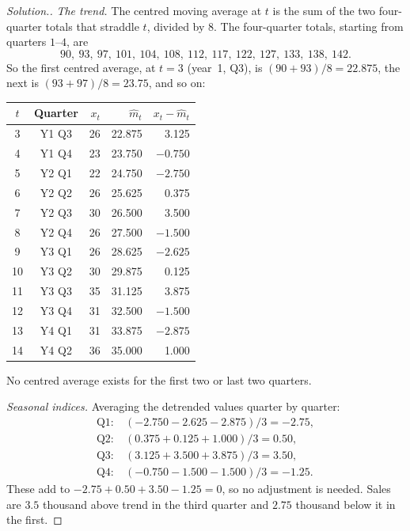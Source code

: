 \documentclass[11pt,a4paper]{article}
\theoremstyle{definition}
\newenvironment{solution}
  {\renewcommand{\qedsymbol}{}\begin{proof}[\textit{Solution}.]}
  {\end{proof}}
\begin{document}
\begin{solution}
\emph{The trend.} The centred moving average at $t$ is the sum of the two four-quarter totals that straddle $t$,
divided by $8$. The four-quarter totals, starting from quarters $1$--$4$, are
\[
90, \ 93, \ 97, \ 101, \ 104, \ 108, \ 112, \ 117, \ 122, \ 127, \ 133, \ 138, \ 142 .
\]
So the first centred average, at $t = 3$ (year~1, Q3), is $(90 + 93)/8 = 22.875$, the next is $(93 + 97)/8 = 23.75$, and so on:
\begin{center}
\begin{tabular}{ccrrr}
$t$ & Quarter & $x_t$ & $\hat m_t$ & $x_t - \hat m_t$ \\
\hline
3 & Y1 Q3 & 26 & 22.875 & 3.125 \\
4 & Y1 Q4 & 23 & 23.750 & $-0.750$ \\
5 & Y2 Q1 & 22 & 24.750 & $-2.750$ \\
6 & Y2 Q2 & 26 & 25.625 & 0.375 \\
7 & Y2 Q3 & 30 & 26.500 & 3.500 \\
8 & Y2 Q4 & 26 & 27.500 & $-1.500$ \\
9 & Y3 Q1 & 26 & 28.625 & $-2.625$ \\
10 & Y3 Q2 & 30 & 29.875 & 0.125 \\
11 & Y3 Q3 & 35 & 31.125 & 3.875 \\
12 & Y3 Q4 & 31 & 32.500 & $-1.500$ \\
13 & Y4 Q1 & 31 & 33.875 & $-2.875$ \\
14 & Y4 Q2 & 36 & 35.000 & 1.000 \\
\end{tabular}
\end{center}
No centred average exists for the first two or last two quarters.

\emph{Seasonal indices.} Averaging the detrended values quarter by quarter:
\begin{align*}
\text{Q1}: \ & (-2.750 - 2.625 - 2.875)/3 = -2.75 , \\
\text{Q2}: \ & (0.375 + 0.125 + 1.000)/3 = 0.50 , \\
\text{Q3}: \ & (3.125 + 3.500 + 3.875)/3 = 3.50 , \\
\text{Q4}: \ & (-0.750 - 1.500 - 1.500)/3 = -1.25 .
\end{align*}
These add to $-2.75 + 0.50 + 3.50 - 1.25 = 0$, so no adjustment is needed. Sales are $3.5$ thousand above trend in the third
quarter and $2.75$ thousand below it in the first.


\end{solution}
\end{document}
